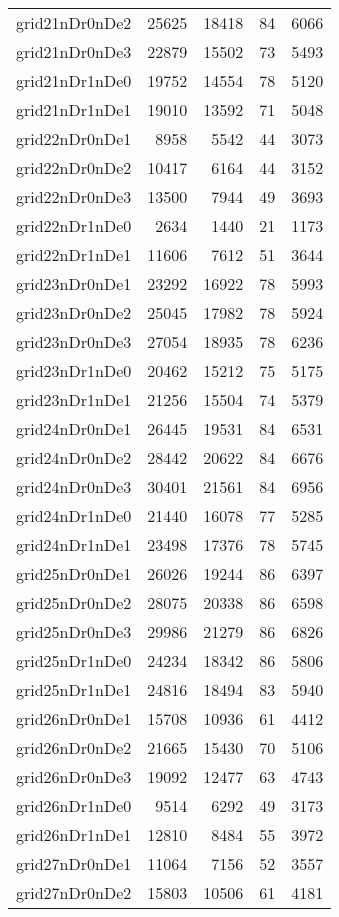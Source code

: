 \begin{longtable}{lrrrr}
grid21nDr0nDe2 & 25625 & 18418 & 84 & 6066 \\
grid21nDr0nDe3 & 22879 & 15502 & 73 & 5493 \\
grid21nDr1nDe0 & 19752 & 14554 & 78 & 5120 \\
grid21nDr1nDe1 & 19010 & 13592 & 71 & 5048 \\
grid22nDr0nDe1 & 8958 & 5542 & 44 & 3073 \\
grid22nDr0nDe2 & 10417 & 6164 & 44 & 3152 \\
grid22nDr0nDe3 & 13500 & 7944 & 49 & 3693 \\
grid22nDr1nDe0 & 2634 & 1440 & 21 & 1173 \\
grid22nDr1nDe1 & 11606 & 7612 & 51 & 3644 \\
grid23nDr0nDe1 & 23292 & 16922 & 78 & 5993 \\
grid23nDr0nDe2 & 25045 & 17982 & 78 & 5924 \\
grid23nDr0nDe3 & 27054 & 18935 & 78 & 6236 \\
grid23nDr1nDe0 & 20462 & 15212 & 75 & 5175 \\
grid23nDr1nDe1 & 21256 & 15504 & 74 & 5379 \\
grid24nDr0nDe1 & 26445 & 19531 & 84 & 6531 \\
grid24nDr0nDe2 & 28442 & 20622 & 84 & 6676 \\
grid24nDr0nDe3 & 30401 & 21561 & 84 & 6956 \\
grid24nDr1nDe0 & 21440 & 16078 & 77 & 5285 \\
grid24nDr1nDe1 & 23498 & 17376 & 78 & 5745 \\
grid25nDr0nDe1 & 26026 & 19244 & 86 & 6397 \\
grid25nDr0nDe2 & 28075 & 20338 & 86 & 6598 \\
grid25nDr0nDe3 & 29986 & 21279 & 86 & 6826 \\
grid25nDr1nDe0 & 24234 & 18342 & 86 & 5806 \\
grid25nDr1nDe1 & 24816 & 18494 & 83 & 5940 \\
grid26nDr0nDe1 & 15708 & 10936 & 61 & 4412 \\
grid26nDr0nDe2 & 21665 & 15430 & 70 & 5106 \\
grid26nDr0nDe3 & 19092 & 12477 & 63 & 4743 \\
grid26nDr1nDe0 & 9514 & 6292 & 49 & 3173 \\
grid26nDr1nDe1 & 12810 & 8484 & 55 & 3972 \\
grid27nDr0nDe1 & 11064 & 7156 & 52 & 3557 \\
grid27nDr0nDe2 & 15803 & 10506 & 61 & 4181 \\

\end{longtable}
